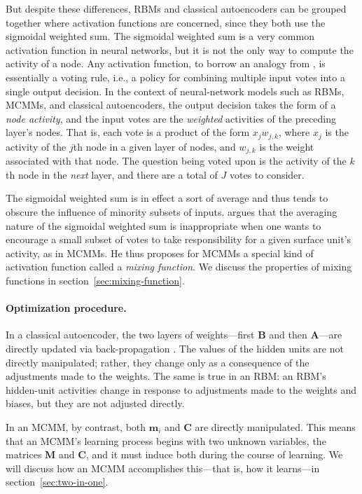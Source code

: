 But despite these differences, RBMs and classical autoencoders can be grouped together where activation functions are concerned, since they both use the sigmoidal weighted sum.
The sigmoidal weighted sum is a very common activation function in neural networks, 
but it is not the only way to compute the activity of a node. Any activation function, to borrow
an analogy from \citet{saund:94}, is essentially a voting rule, i.e.,  a policy 
for combining multiple input votes into a single output decision.  
In the context of neural-network models such as RBMs, MCMMs, and 
classical autoencoders, the output decision takes the form of a \emph{node activity},
and the input votes are the \emph{weighted} activities of the preceding layer's nodes. 
That is, each vote is a product of the form $x_{j} w_{j,k}$, where $x_{j}$ is the activity 
of the $j$th node in a given layer of nodes, and $w_{j,k}$ is the weight associated with that 
node. The question being voted upon is the activity of the $k$th node in the 
\emph{next} layer, and there are
a total of $J$ votes to consider.

The sigmoidal weighted sum is in effect a sort of average and thus tends to obscure
the influence of minority subsets of inputs. \citet{saund:94} argues 
that the averaging nature of the sigmoidal weighted sum is inappropriate when one wants to encourage
a small subset of votes to take responsibility for a given surface unit's activity, as in MCMMs.
He thus proposes for MCMMs a special kind of activation function called a \emph{mixing function}.
We discuss the properties of mixing functions in 
section~\ref{sec:mixing-function}.

\paragraph{Optimization procedure.}  In a classical autoencoder, the two layers of 
weights---first $\textbf{B}$ and then $\textbf{A}$---are directly updated via 
back-propagation \citep{rumelhart-et-al:1985, hinton:1987, hinton:1987trans, bourlard:1988}.
The values of the hidden units are not directly manipulated; rather, they change  
only as a 
consequence of the adjustments made to the weights. The same is true in an RBM: 
an RBM's hidden-unit activities change in response to adjustments 
made to the weights and biases, but they are not
adjusted directly.

In an MCMM, by contrast, both $\textbf{m}_i$ and $\textbf{C}$ are directly manipulated. This means that
an MCMM's learning process begins with two unknown variables, the matrices $\textbf{M}$ and 
$\textbf{C}$, and it must induce both during the course of learning. We will discuss how an MCMM accomplishes this---that is, how it learns---in section~\ref{sec:two-in-one}.

